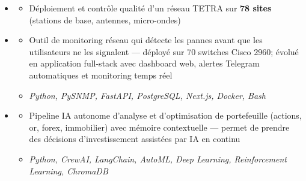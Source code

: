 \documentclass[11pt,a4paper]{article}
\renewcommand{\itemspace}{\vspace{0.2em}}
\begin{document}
\begin{itemize}[leftmargin=1em, label={}]
    \itemspace
    \item
    \begin{itemize}[leftmargin=1.5em, label={$\circ$}, nosep]
        \item Déploiement et contrôle qualité d'un réseau TETRA sur \textbf{78 sites} (stations de base, antennes, micro-ondes)
    \end{itemize}
\end{itemize}

\begin{itemize}[leftmargin=1em, label={}]
    \item
    \begin{itemize}[leftmargin=1.5em, label={$\circ$}, nosep]
        \item Outil de monitoring réseau qui détecte les pannes avant que les utilisateurs ne les signalent — déployé sur 70 switches Cisco 2960; évolué en application full-stack avec dashboard web, alertes Telegram automatiques et monitoring temps réel
        \item \emph{Python, PySNMP, FastAPI, PostgreSQL, Next.js, Docker, Bash}
    \end{itemize}

    \itemspace
    \item
    \begin{itemize}[leftmargin=1.5em, label={$\circ$}, nosep]
        \item Pipeline IA autonome d'analyse et d'optimisation de portefeuille (actions, or, forex, immobilier) avec mémoire contextuelle — permet de prendre des décisions d'investissement assistées par IA en continu
        \item \emph{Python, CrewAI, LangChain, AutoML, Deep Learning, Reinforcement Learning, ChromaDB}
    \end{itemize}
\end{itemize}
\end{document}

